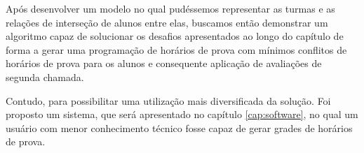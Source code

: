 \vspace{15pt}

\lstset{ numbers=left, numberstyle=\tiny, stepnumber=1, numbersep=15pt}



Após desenvolver um modelo no qual pudéssemos representar as turmas e as relações de interseção de alunos entre elas, buscamos então demonstrar um algoritmo capaz de solucionar os desafios apresentados ao longo do capítulo de forma a gerar uma programação de horários de prova com mínimos conflitos de horários de prova para os alunos e consequente aplicação de avaliações de segunda chamada.

Contudo, para possibilitar uma utilização mais diversificada da solução. Foi proposto um sistema, que será apresentado no capítulo \ref{cap:software}, no qual um usuário com menor conhecimento técnico fosse capaz de gerar grades de horários de prova.